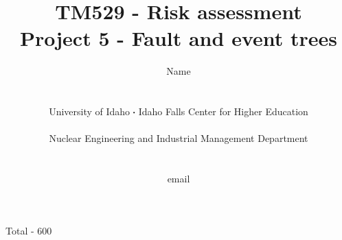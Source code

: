 \documentclass[11pt,a4paper]{article}
\newcommand*\sq{\mathbin{\vcenter{\hbox{\rule{.3ex}{.3ex}}}}} %
\begin{document}
\begin{titlepage}
    \title{
        TM529 - Risk assessment\\
        Project 5 - Fault and event trees\\
    }
    \author{
        Name
        \\ \\ \\
        University of Idaho $\sq$ Idaho Falls Center for Higher Education
        \\ \\
        Nuclear Engineering and Industrial Management Department
        \\ \\ \\
        email 
    }
\clearpage %
\maketitle
\vspace*{\fill}
\begin{flushright}{
        Total - 600
}
\end{flushright}
\thispagestyle{empty} %
\end{titlepage}
\end{document}
